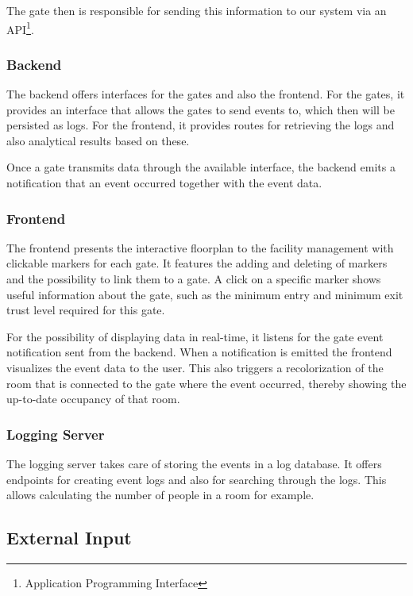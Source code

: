 The gate then is responsible for sending this information to our system via an API\footnote{Application Programming Interface}.


\subsubsection{Backend}
\label{Backend}

The backend offers interfaces for the gates and also the frontend. For the gates, it provides an interface that allows the gates to send events to, which then will be persisted as logs.
For the frontend, it provides routes for retrieving the logs and also analytical results based on these.

Once a gate transmits data through the available interface, the backend emits a notification that an event occurred together with the event data. 


\subsubsection{Frontend}
\label{Frontend}

The frontend presents the interactive floorplan to the facility management with clickable markers for each gate.
It features the adding and deleting of markers and the possibility to link them to a gate.
A click on a specific marker shows useful information about the gate, such as the minimum entry and minimum exit trust level required for this gate.

For the possibility of displaying data in real-time, it listens for the gate event notification sent from the backend. When a notification is emitted the frontend visualizes the event data to the user. This also triggers a recolorization of the room that is connected to the gate where the event occurred, thereby showing the up-to-date occupancy of that room.

\subsubsection{Logging Server}
\label{Logging Server}

The logging server takes care of storing the events in a log database. It offers endpoints for creating event logs and also for searching through the logs. This allows calculating the number of people in a room for example.

\subsection{External Input}

